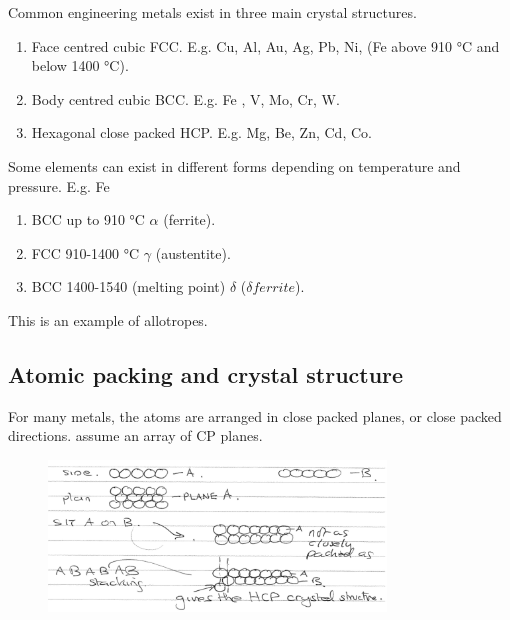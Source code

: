 \documentclass[class=report, crop=false, 12pt,a4paper]{standalone}
\begin{document}
Common engineering metals exist in three main crystal structures.
\begin{enumerate}[noitemsep]
  \item Face centred cubic FCC. E.g. Cu, Al, Au, Ag, Pb, Ni, (Fe above 910 \si{\celsius} and below 1400 \si{\celsius}).
  \item Body centred cubic BCC. E.g. Fe , V, Mo, Cr, W.
  \item Hexagonal close packed HCP. E.g. Mg, Be, Zn, Cd, Co.
\end{enumerate}
Some elements can exist in different forms depending on temperature and pressure. E.g. Fe
\begin{enumerate}
  \item BCC up to 910 \si{\celsius} $\alpha$ (ferrite).
  \item FCC 910-1400 \si{\celsius} $\gamma$ (austentite).
  \item BCC 1400-1540 (melting point) $\delta$ ($\delta ferrite$).
\end{enumerate}
This is an example of allotropes.
\subsection{Atomic packing and crystal structure}
For many metals, the atoms are arranged in close packed planes, or close packed directions. assume an array of CP planes.
\begin{figure}
  \centering
  \includegraphics[width = 0.8\textwidth ]{../img/CPStructure}
\end{figure}
\end{document}
